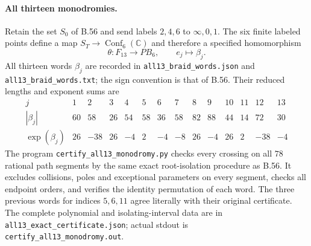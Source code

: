 \paragraph{All thirteen monodromies.}
Retain the set $S_0$ of B.56 and send labels $2,4,6$ to
$\infty,0,1$.  The six finite labeled points define a map
$S_T\to\operatorname{Conf}_6(\mathbb C)$ and therefore a
specified homomorphism
\[
 \theta:F_{13}\longrightarrow PB_6,\qquad e_j\longmapsto\beta_j.
 \tag{B.56.6}
\]
All thirteen words $\beta_j$ are recorded in
\texttt{all13\_braid\_words.json} and
\texttt{all13\_braid\_words.txt}; the sign convention is that
of B.56.  Their reduced lengths and exponent sums are
\[
\begin{array}{c|rrrrrrrrrrrrr}
j&1&2&3&4&5&6&7&8&9&10&11&12&13\\\hline
|\beta_j|&60&58&26&54&58&36&58&82&88&44&14&72&30\\
\operatorname{exp}(\beta_j)&26&-38&26&-4&2&-4&-8&26&-4&26&2&-38&-4
\end{array}
\]
The program \texttt{certify\_all13\_monodromy.py} checks every
crossing on all $78$ rational path segments by the same exact
root-isolation procedure as B.56.  It excludes collisions,
poles and exceptional parameters on every segment, checks all
endpoint orders, and verifies the identity permutation of
each word.  The three previous words for indices $5,6,11$
agree literally with their original certificate.
The complete polynomial and isolating-interval data are in
\texttt{all13\_exact\_certificate.json}; actual stdout is
\texttt{certify\_all13\_monodromy.out}.

